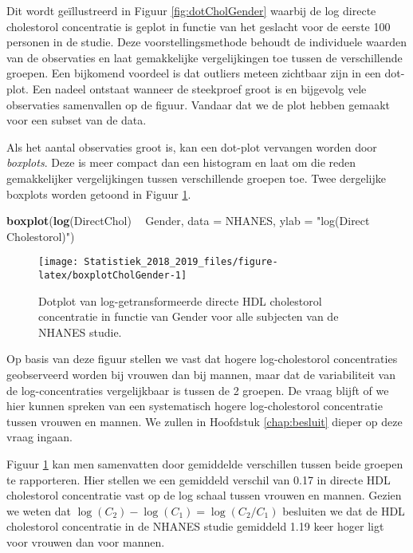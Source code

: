 \documentclass[12pt,dutch,coursenotes]{book}
\newenvironment{Shaded}{\begin{snugshade}}{\end{snugshade}}
\newcommand{\KeywordTok}[1]{\textcolor[rgb]{0.13,0.29,0.53}{\textbf{#1}}}
\newcommand{\DataTypeTok}[1]{\textcolor[rgb]{0.13,0.29,0.53}{#1}}
\newcommand{\StringTok}[1]{\textcolor[rgb]{0.31,0.60,0.02}{#1}}
\newcommand{\OperatorTok}[1]{\textcolor[rgb]{0.81,0.36,0.00}{\textbf{#1}}}
\newcommand{\NormalTok}[1]{#1}
\theoremstyle{definition}
\theoremstyle{definition}
\theoremstyle{definition}
\theoremstyle{remark}
\begin{document}
Dit wordt geïllustreerd in Figuur \ref{fig:dotCholGender} waarbij de log
directe cholestorol concentratie is geplot in functie van het geslacht
voor de eerste 100 personen in de studie. Deze voorstellingsmethode
behoudt de individuele waarden van de observaties en laat gemakkelijke
vergelijkingen toe tussen de verschillende groepen. Een bijkomend
voordeel is dat outliers meteen zichtbaar zijn in een dot-plot. Een
nadeel ontstaat wanneer de steekproef groot is en bijgevolg vele
observaties samenvallen op de figuur. Vandaar dat we de plot hebben
gemaakt voor een subset van de data.

Als het aantal observaties groot is, kan een dot-plot vervangen worden
door \emph{boxplots}. Deze is meer compact dan een histogram en laat om
die reden gemakkelijker vergelijkingen tussen verschillende groepen toe.
Twee dergelijke boxplots worden getoond in Figuur
\ref{fig:boxplotCholGender}.

\begin{Shaded}
\begin{Highlighting}[]
\KeywordTok{boxplot}\NormalTok{(}\KeywordTok{log}\NormalTok{(DirectChol) }\OperatorTok{~}\StringTok{ }\NormalTok{Gender, }\DataTypeTok{data =}\NormalTok{ NHANES, }\DataTypeTok{ylab =} \StringTok{"log(Direct Cholestorol)"}\NormalTok{)}
\end{Highlighting}
\end{Shaded}

\begin{figure}

{\centering \texttt{[image: Statistiek\_2018\_2019\_files/figure-latex/boxplotCholGender-1]} 

}

\caption{Dotplot van log-getransformeerde directe HDL cholestorol concentratie in functie van Gender voor alle subjecten van de NHANES studie.}\label{fig:boxplotCholGender}
\end{figure}

Op basis van deze figuur stellen we vast dat hogere log-cholestorol
concentraties geobserveerd worden bij vrouwen dan bij mannen, maar dat
de variabiliteit van de log-concentraties vergelijkbaar is tussen de 2
groepen. De vraag blijft of we hier kunnen spreken van een systematisch
hogere log-cholestorol concentratie tussen vrouwen en mannen. We zullen
in Hoofdstuk \ref{chap:besluit} dieper op deze vraag ingaan.

Figuur \ref{fig:boxplotCholGender} kan men samenvatten door gemiddelde
verschillen tussen beide groepen te rapporteren. Hier stellen we een
gemiddeld verschil van 0.17 in directe HDL cholestorol concentratie vast
op de log schaal tussen vrouwen en mannen. Gezien we weten dat
\(\log(C_2)-\log(C_1)=\log(C_2/C_1)\) besluiten we dat de HDL
cholestorol concentratie in de NHANES studie gemiddeld 1.19 keer hoger
ligt voor vrouwen dan voor mannen.
\end{document}
